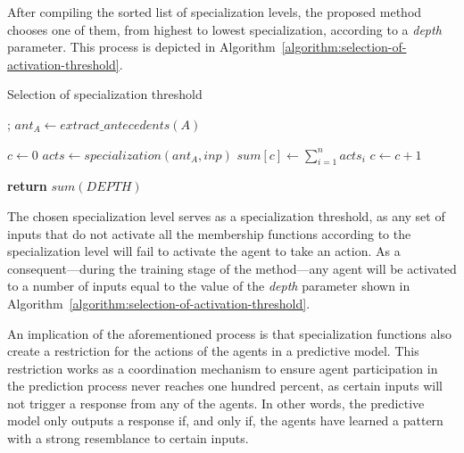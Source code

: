 \documentclass{ieeeaccess}
\begin{document}
After compiling the sorted list of specialization levels, the proposed method chooses one of them, from highest to lowest specialization, according to a \textit{depth} parameter. This process is depicted in Algorithm~\ref{algorithm:selection-of-activation-threshold}.

\begin{algorithm}
  \caption{Selection of specialization threshold}
  \label{algorithm:selection-of-activation-threshold}
  \begin{algorithmic}[1]
    ;
    \State $ant_A\gets extract\_antecedents(A)$

    \State $c\gets 0$
    \State $acts \gets specialization(ant_A, inp)$
    \State $sum[c] \gets \sum_{i = 1}^{n} acts_i$
    \State $c \gets c + 1$
    \EndFor

    \State \textbf{return} $sum(DEPTH)$
    \EndProcedure
  \end{algorithmic}
\end{algorithm}


The chosen specialization level serves as a specialization threshold, as any set of inputs that do not activate all the membership functions according to the specialization level will fail to activate the agent to take an action. As a consequent---during the training stage of the method---any agent will be activated to a number of inputs equal to the value of the \textit{depth} parameter shown in Algorithm~\ref{algorithm:selection-of-activation-threshold}.

An implication of the aforementioned process is that specialization functions also create a restriction for the actions of the agents in a predictive model. This restriction works as a coordination mechanism to ensure agent participation in the prediction process never reaches one hundred percent, as certain 
inputs will not trigger a response from any of the agents. In other words, the predictive model only outputs a response if, and only if, the agents have learned a pattern with a strong resemblance to certain inputs.
\end{document}
